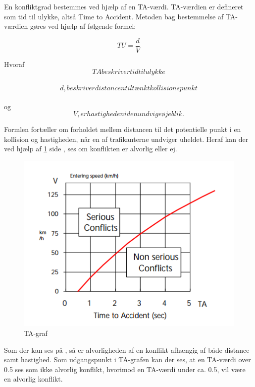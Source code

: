  En konfliktgrad bestemmes ved hjælp af en TA-værdi. TA-værdien er defineret som tid til ulykke, altså Time to Accident. Metoden bag bestemmelse af TA-værdien gøres ved hjælp af følgende formel:

 $$TU=\frac{d}{V} $$

Hvoraf $$TA beskriver tid til ulykke$$ \\ $$d, beskriver distancen til tænkt kollisionspunkt$$ \\ og $$V, er hastigheden i den undvigeøjeblik.$$

Formlen fortæller om forholdet mellem distancen til det potentielle punkt i en kollision og hastigheden, når en af trafikanterne undviger uheldet. Heraf kan der ved hjælp af \cref{fig:tagraff} side \pageref{fig:tagraff},
ses om konflikten er alvorlig eller ej.

\begin{figure}[htbp]

  \centering
  \begin{adjustbox}{max width=\textwidth}
    \includegraphics{figures/Billederogfigur/tugraf.png} %
 \end{adjustbox}
  \caption{TA-graf}
    \label{fig:tagraff}
\end{figure}

Som der kan ses på %
, så er alvorligheden af en konflikt afhængig af både distance samt hastighed.
Som udgangspunkt i TA-grafen kan der ses, at en TA-værdi over 0.5 ses som ikke alvorlig konflikt, hvorimod en TA-værdi under ca. 0.5, vil være en alvorlig konflikt.



